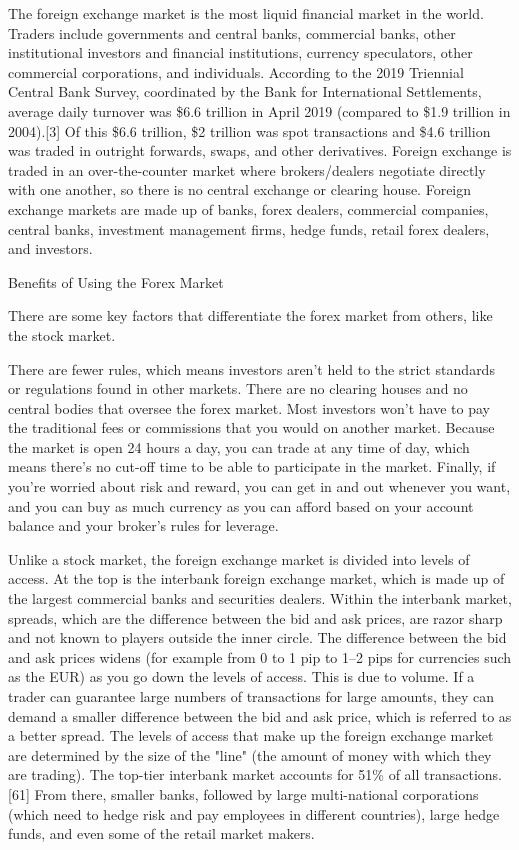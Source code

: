 The foreign exchange market is the most liquid financial market in the world. Traders include governments and central banks, commercial banks, other institutional investors and financial institutions, currency speculators, other commercial corporations, and individuals. According to the 2019 Triennial Central Bank Survey, coordinated by the Bank for International Settlements, average daily turnover was \$6.6 trillion in April 2019 (compared to \$1.9 trillion in 2004).[3] Of this \$6.6 trillion, \$2 trillion was spot transactions and \$4.6 trillion was traded in outright forwards, swaps, and other derivatives.
Foreign exchange is traded in an over-the-counter market where brokers/dealers negotiate directly with one another, so there is no central exchange or clearing house.
Foreign exchange markets are made up of banks, forex dealers, commercial companies, central banks, investment management firms, hedge funds, retail forex dealers, and investors.

Benefits of Using the Forex Market

There are some key factors that differentiate the forex market from others, like the stock market.

    There are fewer rules, which means investors aren't held to the strict standards or regulations found in other markets.
    There are no clearing houses and no central bodies that oversee the forex market.
    Most investors won't have to pay the traditional fees or commissions that you would on another market.
    Because the market is open 24 hours a day, you can trade at any time of day, which means there's no cut-off time to be able to participate in the market.
    Finally, if you're worried about risk and reward, you can get in and out whenever you want, and you can buy as much currency as you can afford based on your account balance and your broker's rules for leverage.

Unlike a stock market, the foreign exchange market is divided into levels of access. At the top is the interbank foreign exchange market, which is made up of the largest commercial banks and securities dealers. Within the interbank market, spreads, which are the difference between the bid and ask prices, are razor sharp and not known to players outside the inner circle. The difference between the bid and ask prices widens (for example from 0 to 1 pip to 1–2 pips for currencies such as the EUR) as you go down the levels of access. This is due to volume. If a trader can guarantee large numbers of transactions for large amounts, they can demand a smaller difference between the bid and ask price, which is referred to as a better spread. The levels of access that make up the foreign exchange market are determined by the size of the "line" (the amount of money with which they are trading). The top-tier interbank market accounts for 51\% of all transactions.[61] From there, smaller banks, followed by large multi-national corporations (which need to hedge risk and pay employees in different countries), large hedge funds, and even some of the retail market makers.

